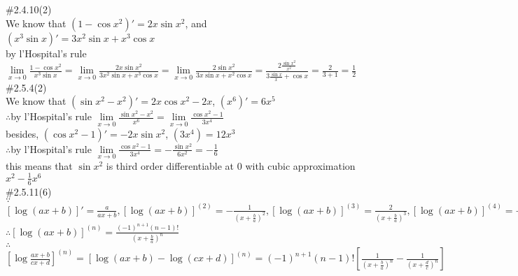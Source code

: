 \documentclass{article}
\begin{document}
\textcolor[rgb]{0.00,0.00,0.50}{\#2.4.10(2)}\\

We know that $(1-\cos x^2)'=2x\sin x^2$, and $(x^3\sin x)'=3x^2\sin x+x^3\cos x$\\

by l'Hospital's rule\\

$\lim \limits_{x \to 0}\displaystyle\frac{1-\cos x^2}{x^3\sin x}=\lim \limits_{x \to 0}\frac{2x\sin x^2}{3x^2\sin x+x^3\cos x}=\lim \limits_{x \to 0}\frac{2\sin x^2}{3x\sin x+x^2\cos x}=\frac{2\frac{\sin x^2}{x^2}}{3\frac{\sin x}{x}+\cos x}=\frac{2}{3+1}=\frac{1}{2}$\\

\textcolor[rgb]{0.00,0.00,0.50}{\#2.5.4(2)}\\

We know that $(\sin x^2-x^2)'=2x\cos x^2-2x$, $(x^6)'=6x^5$\\

$\therefore$\qquad by l'Hospital's rule $\lim \limits_{x \to 0}\displaystyle\frac{\sin x^2-x^2}{x^6}=\lim \limits_{x \to 0}\frac{\cos x^2-1}{3x^4}$\\

besides, $(\cos x^2-1)'=-2x\sin x^2$, $(3x^4)=12x^3$\\

$\therefore$\qquad by l'Hospital's rule $\lim \limits_{x \to 0}\displaystyle\frac{\cos x^2-1}{3x^4}=-\frac{\sin x^2}{6x^2}=-\frac{1}{6}$\\

this means that $\sin x^2$ is third order differentiable at $0$ with cubic approximation $x^2-\displaystyle\frac{1}{6}x^6$\\

\textcolor[rgb]{0.00,0.00,0.50}{\#2.5.11(6)}\\

$\because$\qquad$\left[\log(ax+b)\right]'=\displaystyle\frac{a}{ax+b}, \left[\log(ax+b)\right]^{(2)}=-\displaystyle\frac{1}{(x+\frac{b}{a})^2}, \left[\log(ax+b)\right]^{(3)}=\frac{2}{(x+\frac{b}{a})^3}, \left[\log(ax+b)\right]^{(4)}=-\frac{2\cdot3}{(x+\frac{b}{a})^4}$\\

$\therefore$\qquad$\left[\log(ax+b)\right]^{(n)}=\displaystyle\frac{(-1)^{n+1}(n-1)!}{(x+\frac{b}{a})^n}$\\

$\therefore$\qquad$\left[\log\displaystyle\frac{ax+b}{cx+d}\right]^{(n)}=\left[\log(ax+b)-\log(cx+d)\right]^{(n)}=(-1)^{n+1}(n-1)!\left[\frac{1}{(x+\frac{b}{a})^n}-\frac{1}{(x+\frac{d}{c})^n}\right]$\\
\end{document}

